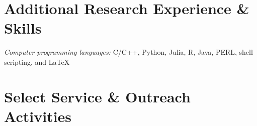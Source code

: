% 

% 

% 

% 

\section*{Additional Research Experience \& Skills}
% 
\myHangIndent
{\sffamily\itshape Computer programming languages:} C/C++, Python, Julia, R, Java,
PERL, shell scripting, and \LaTeX

\section*{Select Service \& Outreach Activities}

